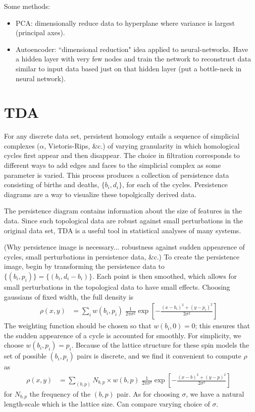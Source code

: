 \documentclass[11pt]{article}
\begin{document}
Some methods:
\begin{itemize}
    \item PCA: dimensionally reduce data to hyperplane where variance is largest (principal axes).
    \item Autoencoder: ``dimensional reduction" idea applied to neural-networks. Have a hidden layer with very few nodes and train the network to reconstruct data similar to input data based just on that hidden layer (put a bottle-neck in neural network).
\end{itemize}


\section{TDA}
For any discrete data set, persistent homology entails a sequence of simplicial complexes ($\alpha$, Vietoris-Rips, \&c.) of varying granularity in which homological cycles first appear and then disappear. The choice in filtration corresponds to different ways to add edges and faces to the simplicial complex as some parameter is varied. This process produces a collection of persistence data consisting of births and deaths, $\{b_i,d_i\}$, for each of the cycles. Persistence diagrams are a way to visualize these topolgically derived data.

The persistence diagram contains information about the size of features in the data. Since such topological data are robust against small perturbations in the original data set, TDA is a useful tool in statistical analyses of many systems.


(Why persistence image is necessary... robustness against sudden appearence of cycles, small perturbations in persistence data, \&c.) To create the persistence image, begin by transforming the persistence data to $\{(b_i,p_i)\}=\{(b_i,d_i-b_i)\}$. Each point is then smoothed, which allows for small perturbations in the topological data to have small effects. Choosing gaussians of fixed width, the full density is
\begin{align}
    \rho(x,y) &= \sum_i w(b_i,p_i)\;\frac{1}{2\pi\sigma^2}\exp\left[-\frac{(x-b_i)^2+(y-p_i)^2}{2\sigma^2}\right]
\end{align}
The weighting function should be chosen so that $w(b_i,0)=0$; this ensures that the sudden appearence of a cycle is accounted for smoothly. For simplicity, we choose $w(b_i,p_i)=p_i$. Because of the lattice structure for these spin models the set of possible $(b_i,p_i)$ pairs is discrete, and we find it convenient to compute $\rho$ as
\begin{align}
    \rho(x,y) &= \sum_{(b,p)}N_{b,p}\times w(b,p)\;\frac{1}{2\pi\sigma^2}\exp\left[-\frac{(x-b)^2+(y-p)^2}{2\sigma^2}\right]
\end{align}
for $N_{b,p}$ the frequency of the $(b,p)$ pair. As for choosing $\sigma$, we have a natural length-scale which is the lattice size. Can compare varying choice of $\sigma$.
\end{document}
